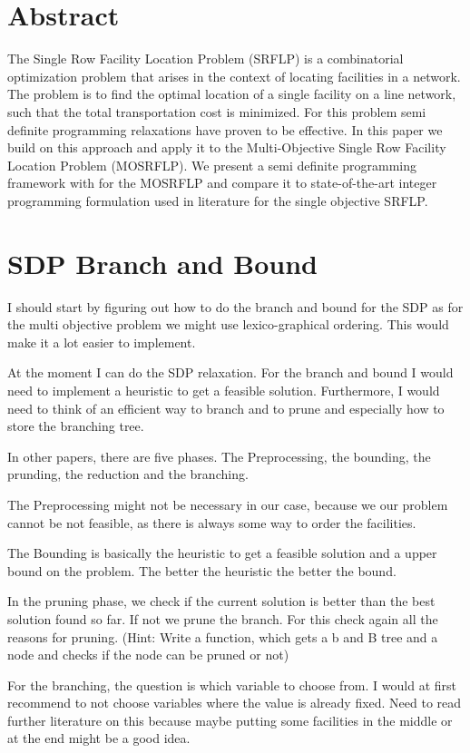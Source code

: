 \documentclass[a4paper]{article}
\begin{document}
\section*{Abstract}
The Single Row Facility Location Problem (SRFLP) is a combinatorial optimization problem that arises in the context of locating facilities in a network. The problem is to find the optimal location of a single facility on a line network, such that the total transportation cost is minimized. For this problem semi definite programming relaxations have proven to be effective. In this paper we build on this approach and apply it to the Multi-Objective Single Row Facility Location Problem (MOSRFLP). We present a semi definite programming framework with for the MOSRFLP and compare it to state-of-the-art integer programming formulation used in literature for the single objective SRFLP. 


\section*{SDP Branch and Bound}

I should start by figuring out how to do the branch and bound for the SDP as for the multi objective problem we might use lexico-graphical ordering. This would make it a lot easier to implement. 

At the moment I can do the SDP relaxation. For the branch and bound I would need to implement a heuristic to get a feasible solution. Furthermore, I would need to think of an efficient way to branch and to prune and especially how to store the branching tree. 

In other papers, there are five phases. The Preprocessing, the bounding, the prunding, the reduction and the branching.

The Preprocessing might not be necessary in our case, because we our problem cannot be not feasible, as there is always some way to order the facilities. 

The Bounding is basically the heuristic to get a feasible solution and a upper bound on the problem. The better the heuristic the better the bound.

In the pruning phase, we check if the current solution is better than the best solution found so far. If not we prune the branch. For this check again all the reasons for pruning. (Hint: Write a function, which gets a b and B tree and a node and checks if the node can be pruned or not)

For the branching, the question is which variable to choose from. I would at first recommend to not choose variables where the value is already fixed. Need to read further literature on this because maybe putting some facilities in the middle or at the end might be a good idea. 
\end{document}
